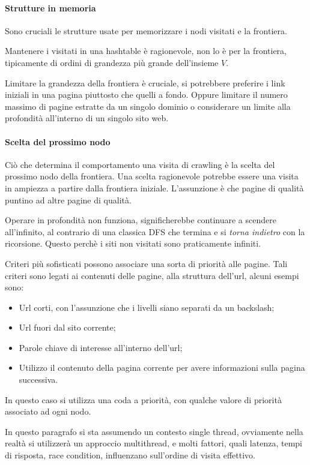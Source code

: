 \paragraph{Strutture in memoria}
Sono cruciali le strutture usate per memorizzare i nodi visitati 
e la frontiera.

Mantenere i visitati in una hashtable è ragionevole, non lo è 
per la frontiera, tipicamente di ordini di grandezza più grande dell'insieme $V$.

Limitare la grandezza della frontiera è cruciale, si potrebbere preferire 
i link iniziali in una pagina piuttosto che quelli a fondo. Oppure limitare 
il numero massimo di pagine estratte da un singolo dominio o considerare 
un limite alla profondità all'interno di un singolo sito web.

\paragraph{Scelta del prossimo nodo}
Ciò che determina il comportamento una visita di crawling è 
la scelta del prossimo nodo della frontiera. Una scelta ragionevole 
potrebbe essere una visita in ampiezza a partire dalla frontiera iniziale.
L'assunzione è che pagine di qualità puntino ad altre pagine di qualità.

Operare in profondità non funziona, significherebbe continuare a scendere 
all'infinito, al contrario di una classica DFS che termina e si \emph{torna indietro} 
con la ricorsione. Questo perchè i siti non visitati sono praticamente infiniti.

Criteri più sofisticati possono associare una sorta di priorità alle pagine. 
Tali criteri sono legati ai contenuti delle pagine, alla struttura dell'url, 
alcuni esempi sono:
\begin{itemize}
    \item Url corti, con l'assunzione che i livelli siano separati da un backslash;
    \item Url fuori dal sito corrente;
    \item Parole chiave di interesse all'interno dell'url;
    \item Utilizzo il contenuto della pagina corrente per avere informazioni 
    sulla pagina successiva.
\end{itemize}
In questo caso si utilizza una coda a priorità, con qualche valore di priorità 
associato ad ogni nodo.

\begin{remark}
    In questo paragrafo si sta assumendo un contesto single thread, ovviamente nella realtà si 
    utilizzerà un approccio multithread, e molti fattori, quali latenza, 
    tempi di risposta, race condition, influenzano sull'ordine di visita effettivo.
\end{remark}

